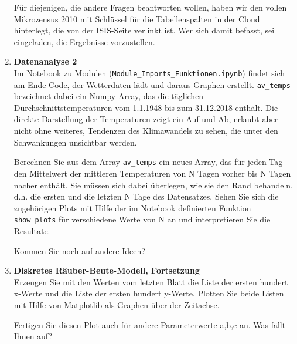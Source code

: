 \begin{enumerate}[1.]
Für diejenigen, die andere Fragen beantworten wollen, haben wir den vollen
Mikrozensus 2010 mit Schlüssel für die Tabellenspalten in der Cloud hinterlegt,
die von der ISIS-Seite verlinkt ist.  Wer sich damit befasst, sei eingeladen,
die Ergebnisse vorzustellen. 

\item \textbf{Datenanalyse 2}\\
Im Notebook zu Modulen (\texttt{Module\_Imports\_Funktionen.ipynb}) findet sich am Ende
Code, der Wetterdaten lädt und daraus Graphen erstellt. 
\texttt{av\_temps}  bezeichnet dabei ein Numpy-Array, das die
täglichen Durchschnittstemperaturen vom 1.1.1948 bis zum 31.12.2018 enthält.
Die direkte Darstellung der Temperaturen zeigt ein Auf-und-Ab, erlaubt aber nicht ohne weiteres, Tendenzen des Klimawandels zu sehen, die unter den Schwankungen unsichtbar werden.

Berechnen Sie aus dem Array \texttt{av\_temps} ein neues Array, das für jeden Tag den Mittelwert der mittleren Temperaturen von N Tagen vorher bis N Tagen nacher enthält. Sie müssen sich dabei überlegen, wie sie den Rand behandeln, d.h. die ersten und die letzten N Tage des Datensatzes. Sehen Sie sich die zugehörigen Plots mit Hilfe der im Notebook definierten Funktion \texttt{show\_plots} für verschiedene Werte von N an und interpretieren Sie die Resultate.

Kommen Sie noch auf andere Ideen?




\item \textbf{Diskretes Räuber-Beute-Modell, Fortsetzung}\\
Erzeugen Sie mit den Werten vom letzten Blatt die Liste der ersten hundert x-Werte und die Liste der ersten hundert y-Werte. Plotten Sie beide Listen mit Hilfe von Matplotlib als Graphen über der Zeitachse.

Fertigen Sie diesen Plot auch für andere Parameterwerte a,b,c an. Was fällt Ihnen auf?





\end{enumerate}
